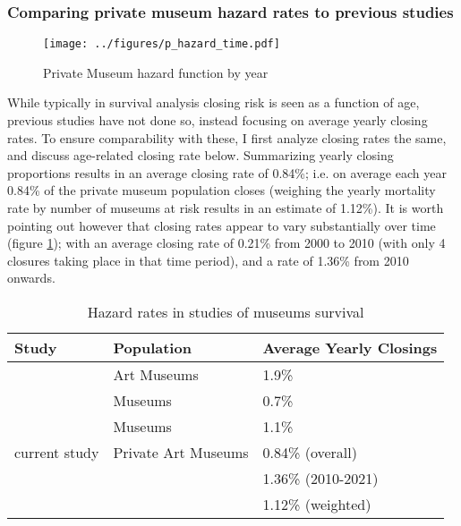 \documentclass[12pt]{article}
\begin{document}
\subsubsection*{Comparing private museum hazard rates to previous studies}

\begin{figure}[htbp]
\centering
\texttt{[image: ../figures/p\_hazard\_time.pdf]}
\caption{\label{fig:p_hazard_time}Private Museum hazard function by year}
\end{figure}

While typically in survival analysis closing risk is seen as a function of age, previous studies have not done so, instead focusing on average yearly closing rates.
To ensure comparability with these, I first analyze closing rates the same, and discuss age-related closing rate below.
Summarizing yearly closing proportions results in an average closing rate of 0.84\%; i.e. on average each year 0.84\% of the private museum population closes (weighing the yearly mortality rate by number of museums at risk results in an estimate of 1.12\%).
It is worth pointing out however that closing rates appear to vary substantially over time (figure \ref{fig:p_hazard_time}); with an average closing rate of 0.21\% from 2000 to 2010 (with only 4 closures taking place in that time period), and a rate of 1.36\% from 2010 onwards.


\begin{table}[htbp]
\caption{\label{tbl:litreview}Hazard rates in studies of museums survival}
\centering
\begin{tabular}{lll}
\hline
Study & Population & Average Yearly Closings\\
\hline
\cite{Hager_2001_vulnerability} & Art Museums & 1.9\%\\
\cite{Gordon_etal_2013_insolvency} & Museums & 0.7\%\\
\cite{Bowen_etal_1994_charitable} & Museums & 1.1\%\\
current study & Private Art Museums & 0.84\% (overall)\\
 &  & 1.36\% (2010-2021)\\
 &  & 1.12\% (weighted)\\
\hline
\end{tabular}
\end{table}

\FloatBarrier
\end{document}
